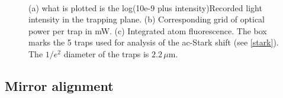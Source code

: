 \documentclass[../Thesis-IJspeert.tex]{subfiles}
\begin{document}
\begin{figure}[t]
\vspace{0em}
\centering
\begin{subfigure}[b]{.49\linewidth}
\centering
\caption{}
\label{a}
\end{subfigure}
\begin{subfigure}[b]{.49\linewidth}
\centering
\caption{}
\label{b}
\end{subfigure}
\\
\vspace{0.3em}
\begin{subfigure}[b]{.49\linewidth}
\centering
\caption{}
\label{b}
\end{subfigure}
\begin{subfigure}[b]{.49\linewidth}
\centering
\caption{}
\label{b}
\end{subfigure}
\caption{(a) what is plotted is the log(10e-9 plus intensity)Recorded light intensity in the trapping plane. (b) Corresponding grid of optical power per trap in mW. (c) Integrated atom fluorescence. The box marks the 5 traps used for analysis of the ac-Stark shift (see \autoref{stark}). The $1/e^2$ diameter of the traps is $2.2\,\mu$m.}
\label{asdf}
\end{figure}


\subsection{Mirror alignment}
\end{document}
